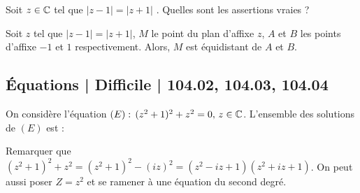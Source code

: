 \begin{question} 
Soit $z\in \mathbb{C}$ tel que $|z-1|=|z+1|$ .  Quelles sont les assertions vraies ?
\begin{answers}
    

    
\end{answers}
\begin{explanations}
Soit $z$ tel que $|z-1|=|z+1|$, $M$ le point du plan d'affixe $z$,  $A$ et $B$ les points d'affixe $-1$ et $1$
respectivement. Alors, $M$ est équidistant de $A$ et $B$.

\end{explanations}

\end{question}



\subsection{Équations | Difficile | 104.02, 104.03, 104.04}

\begin{question} 

On considère l'équation $(E) :  \, (z^2+1)^2+z^2=0, \, z\in \mathbb{C}$. L'ensemble des solutions de $(E)$ est : 
\begin{answers}
    
    
    
    
      

\end{answers}
\begin{explanations}
Remarquer que $(z^2+1)^2+z^2= (z^2+1)^2 - (iz)^2= (z^2-iz+1)(z^2+iz+1)$. On peut aussi poser $Z=z^2$ et se ramener à une équation du second degré.
\end{explanations}

\end{question}



